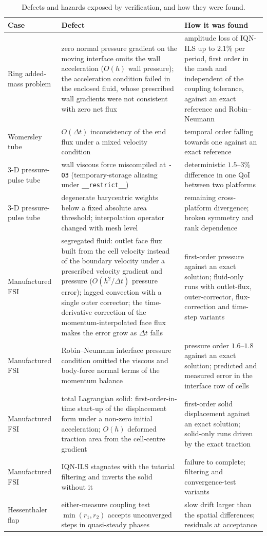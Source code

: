 \begin{table}[htbp]
	\centering
	\footnotesize
	\setlength{\tabcolsep}{3pt}
	\caption{Defects and hazards exposed by verification, and how they were found.}
	\label{tab:defects}
	\begin{tabular}{p{2.6cm}p{5.6cm}p{5.6cm}}
		\toprule
		Case & Defect & How it was found \\
		\midrule
		Ring added-mass problem & zero normal pressure gradient on the moving interface omits the wall acceleration ($O(h)$ wall pressure); the acceleration condition failed in the enclosed fluid, whose prescribed wall gradients were not consistent with zero net flux & amplitude loss of IQN-ILS up to $2.1\%$ per period, first order in the mesh and independent of the coupling tolerance, against an exact reference and Robin--Neumann \\
		Womersley tube & $O(\Delta t)$ inconsistency of the end flux under a mixed velocity condition & temporal order falling towards one against an exact reference \\
		3-D pressure-pulse tube & wall viscous force miscompiled at \texttt{-O3} (temporary-storage aliasing under \texttt{\_\_restrict\_\_}) & deterministic $1.5$--$3\%$ difference in one QoI between two platforms \\
		3-D pressure-pulse tube & degenerate barycentric weights below a fixed absolute area threshold; interpolation operator changed with mesh level & remaining cross-platform divergence; broken symmetry and rank dependence \\
		Manufactured FSI & segregated fluid: outlet face flux built from the cell velocity instead of the boundary velocity under a prescribed velocity gradient and pressure ($O(h^2/\Delta t)$ pressure error); lagged convection with a single outer corrector; the time-derivative correction of the momentum-interpolated face flux makes the error grow as $\Delta t$ falls & first-order pressure against an exact solution; fluid-only runs with outlet-flux, outer-corrector, flux-correction and time-step variants \\
		Manufactured FSI & Robin--Neumann interface pressure condition omitted the viscous and body-force normal terms of the momentum balance & pressure order $1.6$--$1.8$ against an exact solution; predicted and measured error in the interface row of cells \\
		Manufactured FSI & total Lagrangian solid: first-order-in-time start-up of the displacement form under a non-zero initial acceleration; $O(h)$ deformed traction area from the cell-centre gradient & first-order solid displacement against an exact solution; solid-only runs driven by the exact traction \\
		Manufactured FSI & IQN-ILS stagnates with the tutorial filtering and inverts the solid without it & failure to complete; filtering and convergence-test variants \\
		Hessenthaler flap & either-measure coupling test $\min(r_1, r_2)$ accepts unconverged steps in quasi-steady phases & slow drift larger than the spatial differences; residuals at acceptance \\
		\bottomrule
	\end{tabular}
\end{table}

